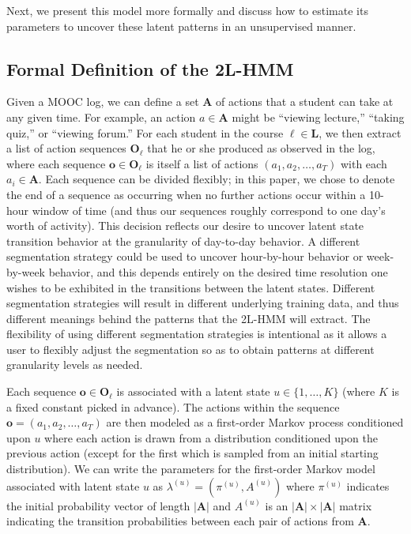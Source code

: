 Next, we present this model more formally and discuss how to
estimate its parameters to uncover these latent patterns in an unsupervised
manner.

\subsection{Formal Definition of the 2L-HMM}

Given a MOOC log, we can define a set $\mathbf{A}$ of actions that a
student can take at any given time. For example, an action $a \in
\mathbf{A}$ might be ``viewing lecture,'' ``taking quiz,'' or ``viewing
forum.'' For each student in the course $\ell \in \mathbf{L}$, we then
extract a list of action sequences $\mathbf{O}_\ell$ that he or she
produced as observed in the log, where each sequence $\mathbf{o} \in
\mathbf{O}_\ell$ is itself a list of actions $(a_1, a_2, \ldots, a_T)$ with
each $a_i \in \mathbf{A}$.  Each sequence can be divided flexibly; in this
paper, we chose to denote the end of a sequence as occurring when no further
actions occur within a 10-hour window of time (and thus our sequences
roughly correspond to one day's worth of activity). This decision reflects
our desire to uncover latent state transition behavior at the granularity
of day-to-day behavior. A different segmentation strategy could be used to
uncover hour-by-hour behavior or week-by-week behavior, and this depends
entirely on the desired time resolution one wishes to be exhibited in the
transitions between the latent states. Different segmentation strategies
will result in different underlying training data, and thus different
meanings behind the patterns that the 2L-HMM will extract. The flexibility of
using different segmentation strategies is intentional as it allows a user to
flexibly adjust the segmentation so as to obtain patterns at different granularity levels as needed. 

Each sequence $\mathbf{o} \in \mathbf{O}_\ell$ is associated with a latent
state $u \in \{1,\ldots,K\}$ (where $K$ is a fixed constant picked in
advance). The actions within the sequence $\mathbf{o} = (a_1, a_2, \ldots,
a_T)$ are then modeled as a first-order Markov process conditioned upon $u$
where each action is drawn from a distribution conditioned upon the
previous action (except for the first which is sampled from an initial
starting distribution). We can write the parameters for the first-order
Markov model associated with latent state $u$ as $\lambda^{(u)} =
(\pi^{(u)}, A^{(u)})$ where $\pi^{(u)}$ indicates the initial probability
vector of length $|\mathbf{A}|$ and $A^{(u)}$ is an $|\mathbf{A}| \times
|\mathbf{A}|$ matrix indicating the transition probabilities between each
pair of actions from $\mathbf{A}$.

